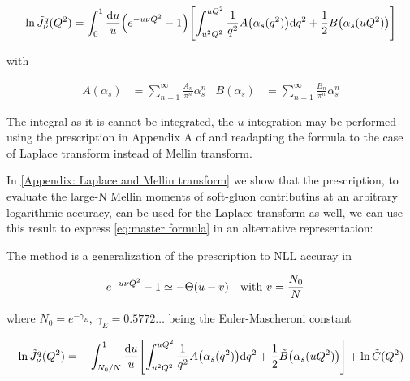 \documentclass[../main.tex]{subfiles}
\begin{document}
\begin{equation}\label{eq:master formula}
    \ln \tilde{J}_\nu^q(Q^2) = \int_0^1 \frac{\dd u}{u} \qty(e^{-u \nu Q^2}-1)\qty[ \int_{u^2 Q^2}^{u Q^2} \frac{1}{q^2} A\qty(\alpha_s(q^2)) \dd q^2 + \frac{1}{2} B\qty(\alpha_s(u Q^2))]
\end{equation}

with 

\begin{align*}
    A(\alpha_s) &= \sum_{n=1}^\infty \frac{A_n}{\pi^n}\alpha_s^n & B(\alpha_s) &= \sum_{n=1}^\infty \frac{B_n}{\pi^n}\alpha_s^n
\end{align*}

The integral as it is cannot be integrated, the $u$ integration may be performed using the prescription in Appendix A of \cite{Catani_2003_appendix} and
readapting the formula to the case of Laplace transform instead of Mellin transform.

In \cref{Appendix: Laplace and Mellin transform} we show that the prescription, to evaluate the large-N Mellin moments of soft-gluon
contributins at an arbitrary logarithmic accuracy, can be used for the Laplace transform as well, we can use this result to express \cref{eq:master formula} 
in an alternative representation:

The method is a generalization of the prescription to NLL accuray in \cite{CATANI19933}

\begin{equation}
    e^{-u \nu Q^2} - 1 \simeq -\Theta(u-v) \qq{with $v = \frac{N_0}{N}$}
\end{equation}

where $N_0 = e^{-\gamma_E}$, $\gamma_E = 0.5772 \dots $ being the Euler-Mascheroni constant

\begin{equation}\label{eq:master_formula alt}
    \ln \tilde{J}_\nu^q(Q^2) = - \int_{N_0/N}^{1} \frac{\dd u}{u} \qty[ \int_{u^2 Q^2}^{u Q^2} \frac{1}{q^2} A\qty(\alpha_s(q^2)) \dd q^2 + \frac{1}{2} \tilde{B}\qty(\alpha_s(u Q^2))] + \ln \tilde{C}(Q^2)
\end{equation}
\end{document}
